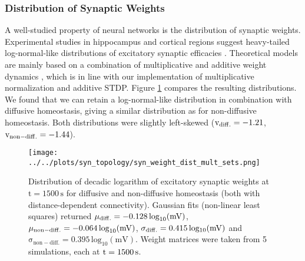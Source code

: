 \documentclass[10pt,a4paper]{article}
\begin{document}
\subsubsection{Distribution of Synaptic Weights} \label{Syn_Weight_Dist_Section}
A well-studied property of neural networks is the distribution of synaptic weights. Experimental studies in hippocampus and cortical regions suggest heavy-tailed log-normal-like distributions of excitatory synaptic efficacies \cite{Song_Connectivity_2005,Lisman_Synapses_1993,Yasumatsu_Synapses_2008,Loewenstein_Spine_Sizes}. Theoretical models are mainly based on a combination of multiplicative and additive weight dynamics \cite{Loewenstein_Spine_Sizes,Statman_Synapses_2014}, which is in line with our implementation of multiplicative normalization and additive STDP. Figure \ref{Weight_Dist} compares the resulting distributions. We found that we can retain a log-normal-like distribution in combination with diffusive homeostasis, giving a similar distribution as for non-diffusive homeostasis. Both distributions were slightly left-skewed ($\mathrm{v_{\rm diff.} = -1.21}$,$\mathrm{v_{\rm non-diff.} = -1.44}$). 
\begin{figure}
\texttt{[image: ../../plots/syn\_topology/syn\_weight\_dist\_mult\_sets.png]}
\caption[Distribution of decadic logarithm of excitatory synaptic weights]{Distribution of decadic logarithm of excitatory synaptic weights at $\mathrm{t=1500\,s}$ for diffusive and non-diffusive homeostasis (both with distance-dependent connectivity). Gaussian fits (non-linear least squares) returned $\mathrm{\mu_{\rm diff.}=-0.128\, \mathrm{log}_{10}(mV)}$, $\mathrm{\mu_{\rm non-diff.}=-0.064\, \mathrm{log}_{10}(mV)}$, $\mathrm{\sigma_{\rm diff.}=0.415\, log_{10}(mV)}$ and $\mathrm{\sigma_{non-diff.}=0.395\, log_{10}(mV)}$. Weight matrices were taken from 5 simulations, each at $\rm t = 1500\,s$.}
\label{Weight_Dist}
\end{figure}
\end{document}
